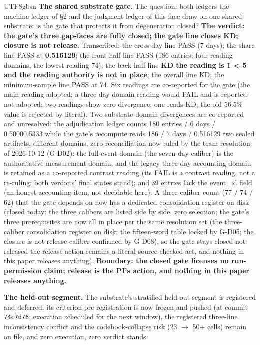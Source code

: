 \documentclass[11pt,letterpaper]{article}
\begin{document}
\begin{CJK}{UTF8}{gbsn}
\textbf{The shared substrate gate.} The question: both ledgers \textemdash{} the machine ledger of \S{}2 and the judgment ledger of this face \textemdash{} draw on one shared substrate; is the gate that protects it from degeneration closed? \textbf{The verdict: the gate's three gap-faces are fully closed; the gate line closes KD; closure is not release.} Transcribed: the cross-day line PASS (7 days); the share line PASS at \textbf{0.516129}; the front-half line PASS (186 entries; four reading domains, the lowest reading 74); the back-half line \textbf{KD \textemdash{} the reading is 1 < 5 and the reading authority is not in place}; the overall line KD; the minimum-sample line PASS at 74. Six readings are co-reported for the gate (the main reading adopted; a three-day domain reading would FAIL and is reported-not-adopted; two readings show zero divergence; one reads KD; the old 56.5\% value is rejected by literal). Two substrate-domain divergences are co-reported and unresolved: the adjudication ledger counts 180 entries / 6 days / 0.5000\textendash{}0.5333 while the gate's recompute reads 186 / 7 days / 0.516129 \textemdash{} two sealed artifacts, different domains, zero reconciliation \textemdash{} now ruled by the team resolution of 2026-10-12 (G-D02): the full-event domain (the seven-day caliber) is the authoritative measurement domain, and the legacy three-day accounting domain is retained as a co-reported contrast reading (its FAIL is a contrast reading, not a re-ruling; both verdicts' final states stand); and 39 entries lack the event\_id field (an honest-accounting item, not decidable here). A three-caliber count (77 / 74 / 62) that the gate depends on now has a dedicated consolidation register on disk (closed today: the three calibers are listed side by side, zero selection; the gate's three prerequisites are now all in place per the same resolution set (the three-caliber consolidation register on disk; the fifteen-word table locked by G-D05; the closure-is-not-release caliber confirmed by G-D08), so the gate stays closed-not-released \textemdash{} the release action remains a literal-source-checked act, and nothing in this paper releases anything). \textbf{Boundary: the closed gate licenses no run-permission claim; release is the PI's action, and nothing in this paper releases anything.}

\textbf{The held-out segment.} The substrate's stratified held-out segment is registered and deferred: its criterion pre-registration is now frozen and pushed (at commit \texttt{74c7d76}; execution scheduled for the next window), the registered three-line inconsistency conflict and the codebook-collapse risk (23 \ensuremath{\to} 50+ cells) remain on file, and zero execution, zero verdict stands.


\end{CJK}
\end{document}
